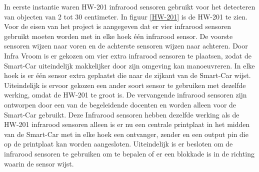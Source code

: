 In eerste instantie waren HW-201 infrarood sensoren gebruikt voor het detecteren van objecten van 2 tot 30 centimeter. In figuur \ref{HW-201}\cite{HW-201-hardware} is de HW-201 te zien. Voor de eisen van het project is aangegeven dat er vier infrarood sensoren gebruikt moeten worden met in elke hoek één infrarood sensor. De voorste sensoren wijzen naar voren en de achterste sensoren wijzen naar achteren. Door Infra Vroom is er gekozen om vier extra infrarood sensoren te plaatsen, zodat de \gls{Smart-Car} uiteindelijk makkelijker door zijn omgeving kan manoeuvreren. In elke hoek is er één sensor extra geplaatst die naar de zijkant van de \gls{Smart-Car} wijst. Uiteindelijk is ervoor gekozen een ander soort sensor te gebruiken met dezelfde werking, omdat de HW-201 te groot is. De vervangende infrarood sensoren zijn ontworpen door een van de begeleidende docenten en worden alleen voor de \gls{Smart-Car} gebruikt. Deze Infrarood sensoren hebben dezelfde werking als de HW-201 infrarood sensoren alleen is er nu een centrale printplaat in het midden van de \gls{Smart-Car} met in elke hoek een ontvanger, zender en een output pin die op de printplaat kan worden aangesloten. Uiteindelijk is er besloten om de infrarood sensoren te gebruiken om te bepalen of er een blokkade is in de richting waarin de sensor wijst.
